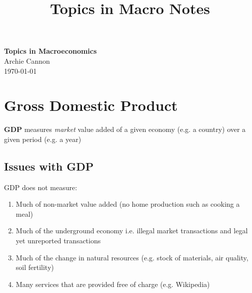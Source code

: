 \documentclass[11pt]{article}
\begin{document}
\title{Topics in Macro Notes}

\thispagestyle{empty}

\begin{center}
{\LARGE \bf Topics in Macroeconomics}\\
{\large Archie Cannon}\\
\today
\end{center}

{
\begin{tcolorbox}[title=Contents, fonttitle=\huge\sffamily\bfseries\selectfont,interior style={left color=contcol1!40!white,right color=contcol2!40!white},frame style={left color=contcol1!80!white,right color=contcol2!80!white},coltitle=black,top=2mm,bottom=2mm,left=2mm,right=2mm,drop fuzzy shadow,enhanced,breakable]
\makeatletter
{}
\makeatother
\end{tcolorbox}}


\newpage

\section{Gross Domestic Product}

\begin{shaded}
\textbf{GDP} measures \textit{market} value added of a given economy (e.g. a country) over a given period (e.g. a year)
\end{shaded}

\subsection*{Issues with GDP}

GDP does not measure:
\begin{enumerate}
    \item Much of non-market value added (no home production such as cooking a meal)
    \item Much of the underground economy i.e. illegal market transactions and legal yet unreported transactions
    \item Much of the change in natural resources (e.g. stock of materials, air quality, soil fertility)
    \item Many services that are provided free of charge (e.g. Wikipedia)
\end{enumerate}
\end{document}
